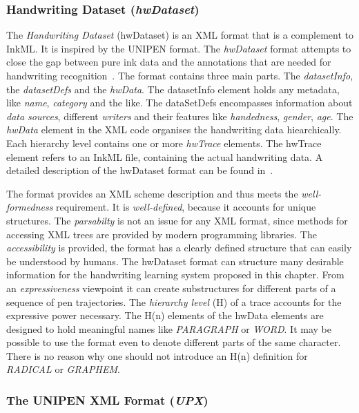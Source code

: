 \subsubsection{Handwriting Dataset (\emph{hwDataset})}
\label{sec:hwre:hwdataset}

The \emph{Handwriting Dataset} (hwDataset) is an XML format that is a complement
to InkML. It is inspired by the UNIPEN format. The \emph{hwDataset} format 
attempts to close the gap between pure ink data and the annotations that are 
needed for handwriting recognition~. 
The format contains three main parts. The \emph{datasetInfo}, 
the \emph{datasetDefs} and the \emph{hwData}. The datasetInfo element holds
any metadata, like \emph{name}, \emph{category} and the like.
The dataSetDefs encompasses information about \emph{data sources}, different
\emph{writers} and their features like \emph{handedness}, \emph{gender}, 
\emph{age}. The \emph{hwData} element in the XML code organises the 
handwriting data hiearchically. Each hierarchy level contains one or 
more \emph{hwTrace} elements. The hwTrace element refers to an InkML file, 
containing the actual handwriting data. A detailed description of the hwDataset 
format can be found in~. 

The format provides an XML scheme description and thus meets the 
\emph{well-formedness} requirement. It is \emph{well-defined}, 
because it accounts for unique structures. The \emph{parsabilty} is not an 
issue for any XML format, since methods for accessing XML trees are provided 
by modern programming libraries.
The \emph{accessibility} is provided, the format has a clearly defined structure
that can easily be understood by humans.
The hwDataset format can structure many desirable information for the handwriting
learning system proposed in this chapter. 
From an \emph{expressiveness} viewpoint it can create substructures for 
different parts of a sequence of pen trajectories. The \emph{hierarchy level} (H)
of a trace accounts for the expressive power necessary. The H(n) elements 
of the hwData elements are designed to hold meaningful names like 
\emph{PARAGRAPH} or \emph{WORD}. It may be possible to use the format even to 
denote different parts of the same character. There is no reason why one should
not introduce an H(n) definition for \emph{RADICAL} or \emph{GRAPHEM}.

\subsubsection{The UNIPEN XML Format (\emph{UPX})}
\label{sec:hwre:unipenformatupx}

